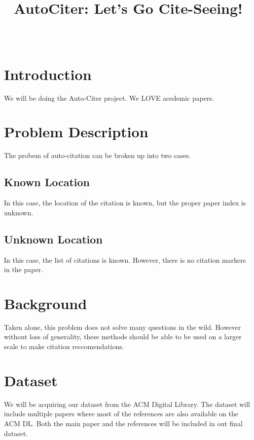 \documentclass[]{IEEEtran}
\begin{document}
\title{AutoCiter: Let's Go Cite-Seeing!}


\author{
\\
}

\maketitle

\thispagestyle{empty}
\pagestyle{empty}

\section{Introduction}
We will be doing the Auto-Citer project. We LOVE acedemic papers.

\section{Problem Description}
The probem of auto-citation can be broken up into two cases.

\subsection{Known Location}
In this case, the location of the citation is known, but the proper paper index is unknown.

\subsection{Unknown Location}
In this case, the list of citations is known. However, there is no citation markers in the paper.

\section{Background}
Taken alone, this problem does not solve many questions in the wild. However without loss of generality, these
methods should be able to be used on a larger scale to make citation reccomendations.

\section{Dataset}
We will be acquiring our dataset from the ACM Digital Library. The dataset will include multiple
papers where most of the references are also available on the ACM DL. Both the main paper and the
references will be included in out final dataset.
\end{document}
